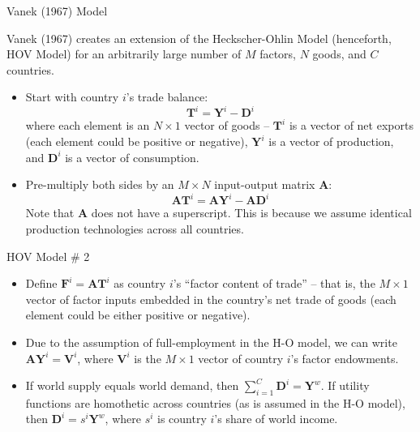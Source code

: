 \documentclass[aspectratio=169]{beamer}
\begin{document}
\begin{frame}{Vanek (1967) Model}

Vanek (1967) creates an extension of the Heckscher-Ohlin Model (henceforth, HOV Model) for an arbitrarily large number of $ M $ factors, $ N $ goods, and $ C $ countries.

\begin{itemize}
    \item<1-> Start with country $ i $'s trade balance:
    \begin{equation*}
        \mathbf{T}^i = \mathbf{Y}^i - \mathbf{D}^i
    \end{equation*}
    where each element is an $ N \times 1 $ vector of goods -- $ \mathbf{T}^i $ is a vector of net exports (each element could be positive or negative), $ \mathbf{Y}^i $ is a vector of production, and $ \mathbf{D}^i $ is a vector of consumption.
    \item<2-> Pre-multiply both sides by an $ M \times N $ input-output matrix $ \mathbf{A} $:
    \begin{equation}
        \mathbf{AT}^i = \mathbf{AY}^i - \mathbf{AD}^i
        \label{eq:factorcontenttrade}
    \end{equation}
    Note that $ \mathbf{A} $ does not have a superscript.  This is because we assume identical production technologies across all countries.
\end{itemize}
    
\end{frame}


\begin{frame}{HOV Model \# 2}

\begin{itemize}
    \item<1-> Define $ \mathbf{F}^i = \mathbf{AT}^i $ as country $ i $’s “factor content of trade” – that is, the  $ M \times 1 $ vector of factor inputs embedded in the country’s net trade of goods (each element could be either positive or negative).
    \item<2-> Due to the assumption of full-employment in the H-O model, we can write $ \mathbf{AY}^i = \mathbf{V}^i $, where $ \mathbf{V}^i $ is the $ M \times 1 $ vector of country $ i $’s factor endowments.
    \item<3-> If world supply equals world demand, then $ \sum_{i=1}^{C} {\mathbf{D}^i} = \mathbf{Y}^w $.  If utility functions are homothetic across countries (as is assumed in the H-O model), then $ \mathbf{D}^i = s^{i} \mathbf{Y}^w $, where $ s^i $ is country $ i $'s share of world income.
\end{itemize}
    
\end{frame}
\end{document}
